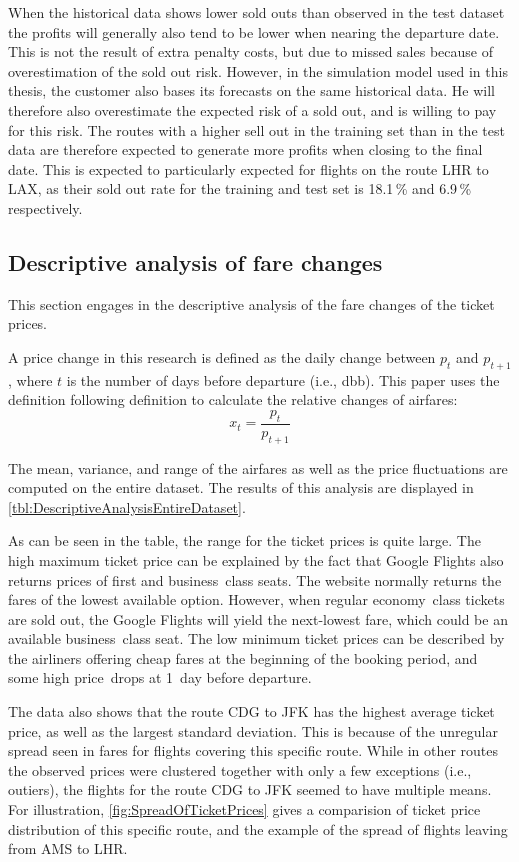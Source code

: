When the historical data shows lower sold outs than observed in the test dataset the profits will generally also tend to be lower when nearing the departure date. This is not the result of extra penalty costs, but due to missed sales because of overestimation of the sold out risk. However, in the simulation model used in this thesis, the customer also bases its forecasts on the same historical data. He will therefore also overestimate the expected risk of a sold out, and is willing to pay for this risk. The routes with a higher sell out in the training set than in the test data are therefore expected to generate more profits when closing to the final date. This is expected to particularly expected for flights on the route LHR to LAX, as their sold out rate for the training and test set is 18.1\,\% and 6.9\,\% respectively.


\subsection{Descriptive analysis of fare changes}
\label{subsec:DescriptiveAnalysisOfFareChanges}
This section engages in the descriptive analysis of the fare changes of the ticket prices.

A price change in this research is defined as the daily change between $p_t$ and $p_{t+1}$, where $t$ is the number of days before departure (i.e., dbb). This paper uses the definition following definition to calculate the relative changes of airfares:
$$ x_t = \frac{p_{t}}{p_{t+1}} $$


The mean, variance, and range of the airfares as well as the price fluctuations are computed on the entire dataset. The results of this analysis are displayed in \autoref{tbl:DescriptiveAnalysisEntireDataset}.

As can be seen in the table, the range for the ticket prices is quite large. The high maximum ticket price can be explained by the fact that Google Flights also returns prices of first and business~class seats. The website normally returns the fares of the lowest available option. However, when regular economy~class tickets are sold out, the Google Flights will yield the next-lowest fare, which could be an available business~class seat. The low minimum ticket prices can be described by the airliners offering cheap fares at the beginning of the booking period, and some high price~drops at 1~day before departure.

The data also shows that the route CDG to JFK has the highest average ticket price, as well as the largest standard deviation. This is because of the unregular spread seen in fares for flights covering this specific route. While in other routes the observed prices were clustered together with only a few exceptions (i.e., outiers), the flights for the route CDG to JFK seemed to have multiple means. For illustration, \autoref{fig:SpreadOfTicketPrices} gives a comparision of ticket price distribution of this specific route, and the example of the spread of flights leaving from AMS to LHR.



